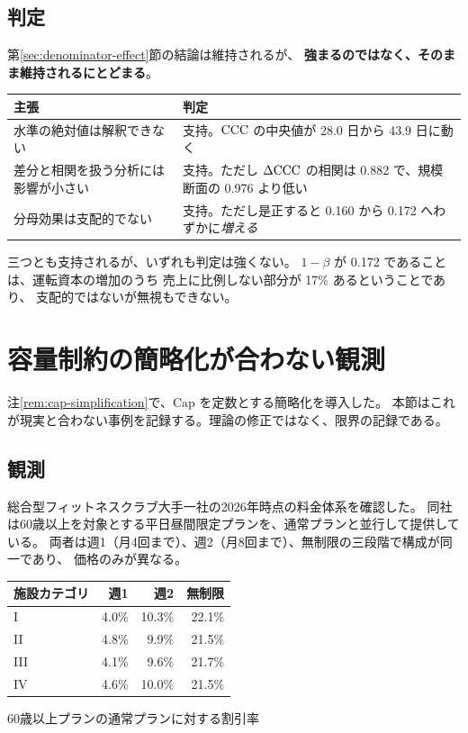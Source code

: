\subsection{判定}

第\ref{sec:denominator-effect}節の結論は維持されるが、
\textbf{強まるのではなく、そのまま維持されるにとどまる}。

\begin{center}
\begin{tabularx}{\textwidth}{@{}Xl@{}}
\toprule
主張 & 判定 \\
\midrule
水準の絶対値は解釈できない & 支持。$\mathrm{CCC}$ の中央値が 28.0 日から 43.9 日に動く \\
差分と相関を扱う分析には影響が小さい & 支持。ただし $\Delta\mathrm{CCC}$ の相関は 0.882 で、規模断面の 0.976 より低い \\
分母効果は支配的でない & 支持。ただし是正すると 0.160 から 0.172 へわずかに\emph{増える} \\
\bottomrule
\end{tabularx}
\label{tab:inventory-verdict}
\end{center}

三つとも支持されるが、いずれも判定は強くない。
$1-\beta$ が 0.172 であることは、運転資本の増加のうち
売上に比例しない部分が 17\% あるということであり、
支配的ではないが無視もできない。

\section{容量制約の簡略化が合わない観測}
\label{sec:cap-observation}

注\ref{rem:cap-simplification}で、$\mathrm{Cap}$ を定数とする簡略化を導入した。
本節はこれが現実と合わない事例を記録する。理論の修正ではなく、限界の記録である。

\subsection{観測}

総合型フィットネスクラブ大手一社の2026年時点の料金体系を確認した。
同社は60歳以上を対象とする平日昼間限定プランを、通常プランと並行して提供している。
両者は週1（月4回まで）、週2（月8回まで）、無制限の三段階で構成が同一であり、
価格のみが異なる。

\begin{center}
\begin{tabular}{@{}lrrr@{}}
\toprule
施設カテゴリ & 週1 & 週2 & 無制限 \\
\midrule
I & 4.0\% & 10.3\% & 22.1\% \\
II & 4.8\% & 9.9\% & 21.5\% \\
III & 4.1\% & 9.6\% & 21.7\% \\
IV & 4.6\% & 10.0\% & 21.5\% \\
\bottomrule
\end{tabular}
\label{tab:senior-plan-discount}
\end{center}
\begin{center}\footnotesize 60歳以上プランの通常プランに対する割引率\end{center}

